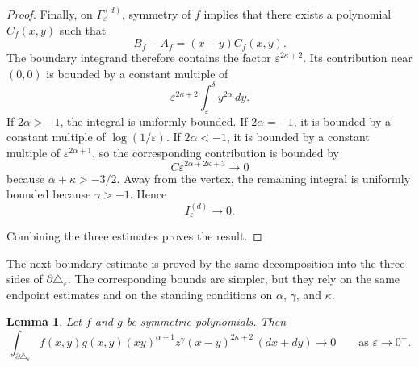 \documentclass[reqno,10pt]{amsart}
\theoremstyle{plain}
\newtheorem{lemma}[theorem]{Lemma}
\numberwithin{equation}{section}
\numberwithin{figure}{section}
\begin{document}
\begin{proof}
Finally, on \(\Gamma_\varepsilon^{(d)}\), symmetry of \(f\) implies
that there exists a polynomial \(C_f(x,y)\) such that
\[
B_f-A_f=(x-y)C_f(x,y).
\]
The boundary integrand therefore contains the factor
\(\varepsilon^{2\kappa+2}\). Its contribution near \((0,0)\) is
bounded by a constant multiple of
\[
\varepsilon^{2\kappa+2}
\int_{\varepsilon}^{\delta}y^{2\alpha}\,dy.
\]
If \(2\alpha>-1\), the integral is uniformly bounded. If
\(2\alpha=-1\), it is bounded by a constant multiple of
\(\log(1/\varepsilon)\). If \(2\alpha<-1\), it is bounded by a
constant multiple of \(\varepsilon^{2\alpha+1}\), so the
corresponding contribution is bounded by
\[
C\varepsilon^{2\alpha+2\kappa+3}
\longrightarrow0
\]
because \(\alpha+\kappa>-3/2\). Away from the vertex, the remaining
integral is uniformly bounded because \(\gamma>-1\). Hence
\[
I_\varepsilon^{(d)}\longrightarrow0.
\]

Combining the three estimates proves the result.
\end{proof}

The next boundary estimate is proved by the same decomposition into the three
sides of \(\partial\triangle_\varepsilon\). The corresponding bounds are
simpler, but they rely on the same endpoint estimates and on the standing
conditions on \(\alpha\), \(\gamma\), and \(\kappa\).

\begin{lemma}\label{lem:ladder-boundary-estimates}
Let \(f\) and \(g\) be symmetric polynomials. Then
\[
\int_{\partial\triangle_\varepsilon}
f(x,y)g(x,y)
(xy)^{\alpha+1}z^\gamma
(x-y)^{2\kappa+2}
\,(dx+dy)
\longrightarrow0
\qquad
\text{as }\varepsilon\to0^+.
\]
\end{lemma}
\end{document}
